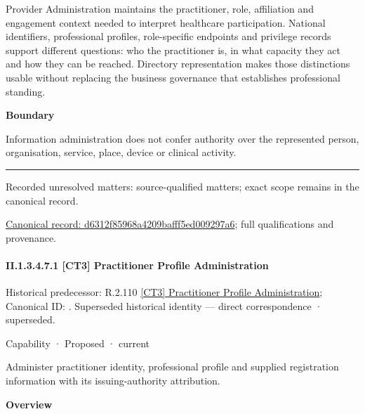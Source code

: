 Provider Administration maintains the practitioner, role, affiliation and engagement context needed to interpret healthcare participation. National identifiers, professional profiles, role-specific endpoints and privilege records support different questions: who the practitioner is, in what capacity they act and how they can be reached. Directory representation makes those distinctions usable without replacing the business governance that establishes professional standing.



\textbf{Boundary}



Information administration does not confer authority over the represented person, organisation, service, place, device or clinical activity.



\medskip\hrule\medskip

{\small Recorded unresolved matters: source-qualified matters; exact scope remains in the canonical record.}\par
{\footnotesize \href{../../../../continuum/strategy/capability/d6312f85968a4209bafff5ed009297a6.md}{Canonical record: d6312f85968a4209bafff5ed009297a6}; full qualifications and provenance.}\par
\paragraph*{II.1.3.4.7.1 [CT3] Practitioner Profile Administration}
\label{navigation:II.1.3.4.7.1}

{\small Historical predecessor: R.2.110 \hyperref[element:2415ddcbc73c47e1a63be310bd4342ee]{[CT3] Practitioner Profile Administration}; Canonical ID: \texttt{}. Superseded historical identity — direct correspondence · superseded.}\par
\label{element:40759a835f7b456e9257c38b67b0a380}
{\small Capability · Proposed · current}\par

Administer practitioner identity, professional profile and supplied registration information with its issuing-authority attribution.



\textbf{Overview}



